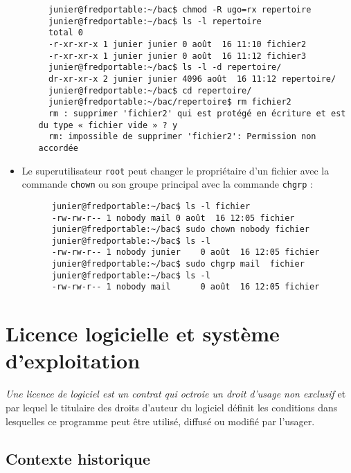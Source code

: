 \documentclass[
  11pt,
]{article}
\newcounter{prop}
\newcounter{prog}
\newcounter{logi}
\newcounter{histo}
\begin{document}
\begin{itemize}
\begin{itemize}
\begin{verbatim}
  junier@fredportable:~/bac$ chmod -R ugo=rx repertoire
  junier@fredportable:~/bac$ ls -l repertoire
  total 0
  -r-xr-xr-x 1 junier junier 0 août  16 11:10 fichier2
  -r-xr-xr-x 1 junier junier 0 août  16 11:12 fichier3
  junier@fredportable:~/bac$ ls -l -d repertoire/
  dr-xr-xr-x 2 junier junier 4096 août  16 11:12 repertoire/
  junier@fredportable:~/bac$ cd repertoire/
  junier@fredportable:~/bac/repertoire$ rm fichier2
  rm : supprimer 'fichier2' qui est protégé en écriture et est du type « fichier vide » ? y 
  rm: impossible de supprimer 'fichier2': Permission non accordée
\end{verbatim}
  \end{itemize}
\item
  Le superutilisateur \texttt{root} peut changer le propriétaire d'un
  fichier avec la commande \texttt{chown} ou son groupe principal avec
  la commande \texttt{chgrp} :

\begin{verbatim}
      junier@fredportable:~/bac$ ls -l fichier
      -rw-rw-r-- 1 nobody mail 0 août  16 12:05 fichier
      junier@fredportable:~/bac$ sudo chown nobody fichier
      junier@fredportable:~/bac$ ls -l
      -rw-rw-r-- 1 nobody junier    0 août  16 12:05 fichier
      junier@fredportable:~/bac$ sudo chgrp mail  fichier
      junier@fredportable:~/bac$ ls -l
      -rw-rw-r-- 1 nobody mail      0 août  16 12:05 fichier
\end{verbatim}
\end{itemize}

\hypertarget{licence-logicielle-et-systuxe8me-dexploitation}{%
\section{Licence logicielle et système
d'exploitation}\label{licence-logicielle-et-systuxe8me-dexploitation}}

\emph{Une licence de logiciel est un contrat qui octroie un droit
d'usage non exclusif} et par lequel le titulaire des droits d'auteur du
logiciel définit les conditions dans lesquelles ce programme peut être
utilisé, diffusé ou modifié par l'usager.

\hypertarget{contexte-historique}{%
\subsection{Contexte historique}\label{contexte-historique}}
\end{document}
